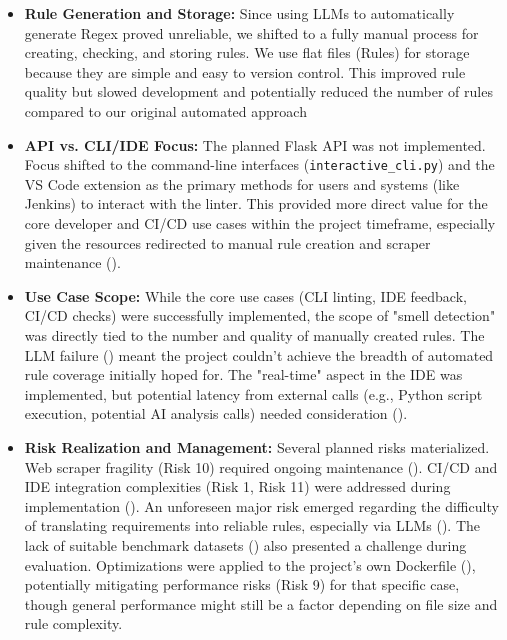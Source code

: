 \begin{itemize}
    \item \textbf{Rule Generation and Storage:} Since using LLMs to automatically generate Regex proved unreliable, we shifted to a fully manual process for creating, checking, and storing rules. We use flat files (Rules) for storage because they are simple and easy to version control. This improved rule quality but slowed development and potentially reduced the number of rules compared to our original automated approach
    \item \textbf{API vs. CLI/IDE Focus:} The planned Flask API was not implemented. Focus shifted to the command-line interfaces  (\texttt{interactive\_cli.py}) and the VS Code extension as the primary methods for users and systems (like Jenkins) to interact with the linter. This provided more direct value for the core developer and CI/CD use cases within the project timeframe, especially given the resources redirected to manual rule creation and scraper maintenance ().
    \item \textbf{Use Case Scope:} While the core use cases (CLI linting, IDE feedback, CI/CD checks) were successfully implemented, the scope of "smell detection" was directly tied to the number and quality of manually created rules. The LLM failure () meant the project couldn't achieve the breadth of automated rule coverage initially hoped for. The "real-time" aspect in the IDE was implemented, but potential latency from external calls (e.g., Python script execution, potential AI analysis calls) needed consideration ().
    \item \textbf{Risk Realization and Management:} Several planned risks materialized. Web scraper fragility (Risk 10) required ongoing maintenance (). CI/CD and IDE integration complexities (Risk 1, Risk 11) were addressed during implementation (). An unforeseen major risk emerged regarding the difficulty of translating requirements into reliable rules, especially via LLMs (). The lack of suitable benchmark datasets () also presented a challenge during evaluation. Optimizations were applied to the project's own Dockerfile (), potentially mitigating performance risks (Risk 9) for that specific case, though general performance might still be a factor depending on file size and rule complexity.
\end{itemize}

